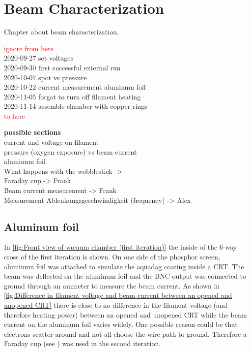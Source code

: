 
\chapter{Beam Characterization}
\label{ch:Beam Characterization}

Chapter about beam characterization.

\noindent \textcolor{red}{ignore from here} \\
2020-09-27 set voltages \\
2020-09-30 first successful external run \\
2020-10-07 spot vs pressure \\
2020-10-22 current measurement aluminum foil \\
2020-11-05 forgot to turn off filament heating \\
2020-11-14 assemble chamber with copper rings \\
\textcolor{red}{to here}

\noindent \textbf{possible sections} \\
current and voltage on filament \\
pressure (oxygen exposure) vs beam current \\
aluminum foil \\
What happens with the wobblestick ->  \\
Faraday cup -> Frank \\
Beam current measurement -> Frank \\
Measurement Ablenkungsgeschwindigkeit (frequency) -> Alex \\


\section{Aluminum foil}
\label{sec:Aluminum foil}

In \cref{fig:Front view of vacuum chamber (first iteration)} the inside of the 6-way cross of the first iteration is shown. On one side of the phosphor screen, aluminum foil was attached to simulate the aquadag coating inside a CRT. The beam was deflected on the aluminum foil and the BNC output was connected to ground through an ammeter to measure the beam current. As shown in \cref{fig:Difference in filament voltage and beam current between an opened and unopened CRT} there is close to no difference in the filament voltage (and therefore heating power) between an opened and unopened CRT while the beam current on the aluminum foil varies widely. One possible reason could be that electrons scatter around and not all choose the wire path to ground. Therefore a Faraday cup (see ) was used in the second iteration.


